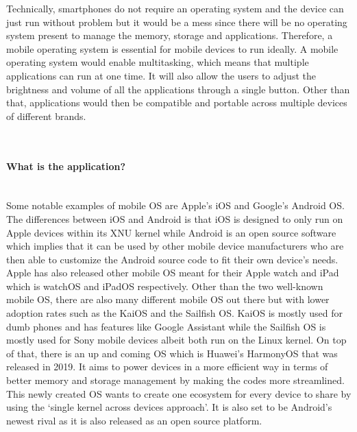 \documentclass[conference]{IEEEtran}
\newcommand{\forceindent}{\leavevmode{\parindent=1em\indent}}
\begin{document}
\medskip
\forceindent Technically, smartphones do not require an operating system and the device can just run without problem but it would be a mess since there will be no operating system present to manage the memory, storage and applications. Therefore, a mobile operating system is essential for mobile devices to run ideally. A mobile operating system would enable multitasking, which means that multiple applications can run at one time. It will also allow the users to adjust the brightness and volume of all the applications through a single button. Other than that, applications would then be compatible and portable across multiple devices of different brands.

\\
\medskip
\paragraph{What is the application?}\mbox{} \\
\forceindent Some notable examples of mobile OS are Apple’s iOS and Google’s Android OS. The differences between iOS and Android is that iOS is designed to only run on Apple devices within its XNU kernel while Android is an open source software which implies that it can be used by other mobile device manufacturers who are then able to customize the Android source code to fit their own device’s needs. Apple has also released other mobile OS meant for their Apple watch and iPad which is watchOS and iPadOS respectively. Other than the two well-known mobile OS, there are also many different mobile OS out there but with lower adoption rates such as the KaiOS and the Sailfish OS. KaiOS is mostly used for dumb phones and has features like Google Assistant while the Sailfish OS is mostly used for Sony mobile devices albeit both run on the Linux kernel. On top of that, there is an up and coming OS which is Huawei’s HarmonyOS that was released in 2019. It aims to power devices in a more efficient way in terms of better memory and storage management by making the codes more streamlined. This newly created OS wants to create one ecosystem for every device to share by using the ‘single kernel across devices approach’. It is also set to be Android’s newest rival as it is also released as an open source platform\cite{CSMOS}.
\medskip
\end{document}
